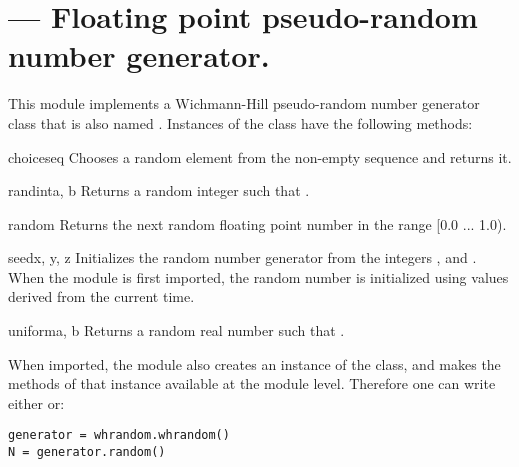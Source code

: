 \section{ ---
         Floating point pseudo-random number generator.}



This module implements a Wichmann-Hill pseudo-random number generator
class that is also named .  Instances of the
 class have the following methods:

\begin{funcdesc}{choice}{seq}
Chooses a random element from the non-empty sequence  and returns it.
\end{funcdesc}

\begin{funcdesc}{randint}{a, b}
Returns a random integer  such that .
\end{funcdesc}

\begin{funcdesc}{random}{}
Returns the next random floating point number in the range [0.0 ... 1.0).
\end{funcdesc}

\begin{funcdesc}{seed}{x, y, z}
Initializes the random number generator from the integers ,
 and .  When the module is first imported, the random
number is initialized using values derived from the current time.
\end{funcdesc}

\begin{funcdesc}{uniform}{a, b}
Returns a random real number  such that .
\end{funcdesc}

When imported, the  module also creates an instance of
the  class, and makes the methods of that instance
available at the module level.  Therefore one can write either 
 or:
\begin{verbatim}
generator = whrandom.whrandom()
N = generator.random()
\end{verbatim}

\begin{seealso}
\end{seealso}
